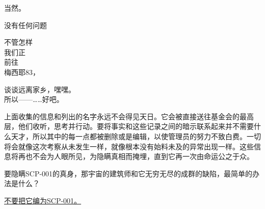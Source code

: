 \begin{scpbox}
当然。

没有任何问题

不管怎样\\
我们正\\
前往\\
梅西耶83，

谈谈远离家乡，嘿嘿。\\
所以——……好吧。


\end{scpbox}

\hr

上面收集的信息和列出的名字永远不会得见天日。它会被直接送往基金会的最高层，他们收听，思考并行动。要将事实和这些记录之间的暗示联系起来并不需要什么天才，所以其中的每一点都被删除或是编辑，以使管理员的努力不致白费。一切将会就像这次考察从未发生一样，就像根本没有始料未及的异常出现一样。这些信息将再也不会为人眼所见，为隐瞒真相而掩埋，直到它再一次由命运公之于众。

要隐瞒SCP-001的真身，那宇宙的建筑师和它无穷无尽的成群的缺陷，最简单的办法是什么？

\hyperref[chap:SCP-184]{不要把它编为SCP-001。}
